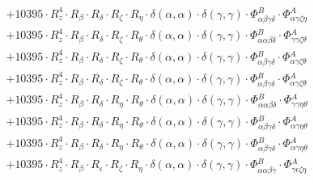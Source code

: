 \documentclass{article}
\begin{document}
\begin{subequations}
\begin{gather}
\begin{array}{c}
 \\[0.2em] 		 + 10395 \cdot R_{z}^{4} \cdot R_{\beta{}} \cdot R_{\delta{}} \cdot R_{\zeta{}} \cdot R_{\eta{}} \cdot \delta{}\left(\alpha{}, \alpha{}\right) \cdot \delta{}\left(\gamma{}, \gamma{}\right) \cdot \Phi{}^{B}_{\alpha{}\beta{}\gamma{}\delta{}} \cdot \Phi{}^{A}_{\alpha{}\gamma{}\zeta{}\eta{}} 
 \\[0.2em] 		 + 10395 \cdot R_{z}^{4} \cdot R_{\beta{}} \cdot R_{\delta{}} \cdot R_{\zeta{}} \cdot R_{\theta{}} \cdot \delta{}\left(\alpha{}, \alpha{}\right) \cdot \delta{}\left(\gamma{}, \gamma{}\right) \cdot \Phi{}^{B}_{\alpha{}\alpha{}\beta{}\delta{}} \cdot \Phi{}^{A}_{\gamma{}\gamma{}\zeta{}\theta{}} 
 \\[0.2em] 		 + 10395 \cdot R_{z}^{4} \cdot R_{\beta{}} \cdot R_{\delta{}} \cdot R_{\zeta{}} \cdot R_{\theta{}} \cdot \delta{}\left(\alpha{}, \alpha{}\right) \cdot \delta{}\left(\gamma{}, \gamma{}\right) \cdot \Phi{}^{B}_{\alpha{}\beta{}\gamma{}\delta{}} \cdot \Phi{}^{A}_{\alpha{}\gamma{}\zeta{}\theta{}} 
 \\[0.2em] 		 + 10395 \cdot R_{z}^{4} \cdot R_{\beta{}} \cdot R_{\delta{}} \cdot R_{\zeta{}} \cdot R_{\theta{}} \cdot \delta{}\left(\alpha{}, \alpha{}\right) \cdot \delta{}\left(\gamma{}, \gamma{}\right) \cdot \Phi{}^{B}_{\alpha{}\beta{}\gamma{}\delta{}} \cdot \Phi{}^{A}_{\alpha{}\gamma{}\zeta{}\theta{}} 
 \\[0.2em] 		 + 10395 \cdot R_{z}^{4} \cdot R_{\beta{}} \cdot R_{\delta{}} \cdot R_{\eta{}} \cdot R_{\theta{}} \cdot \delta{}\left(\alpha{}, \alpha{}\right) \cdot \delta{}\left(\gamma{}, \gamma{}\right) \cdot \Phi{}^{B}_{\alpha{}\alpha{}\beta{}\delta{}} \cdot \Phi{}^{A}_{\gamma{}\gamma{}\eta{}\theta{}} 
 \\[0.2em] 		 + 10395 \cdot R_{z}^{4} \cdot R_{\beta{}} \cdot R_{\delta{}} \cdot R_{\eta{}} \cdot R_{\theta{}} \cdot \delta{}\left(\alpha{}, \alpha{}\right) \cdot \delta{}\left(\gamma{}, \gamma{}\right) \cdot \Phi{}^{B}_{\alpha{}\beta{}\gamma{}\delta{}} \cdot \Phi{}^{A}_{\alpha{}\gamma{}\eta{}\theta{}} 
 \\[0.2em] 		 + 10395 \cdot R_{z}^{4} \cdot R_{\beta{}} \cdot R_{\delta{}} \cdot R_{\eta{}} \cdot R_{\theta{}} \cdot \delta{}\left(\alpha{}, \alpha{}\right) \cdot \delta{}\left(\gamma{}, \gamma{}\right) \cdot \Phi{}^{B}_{\alpha{}\beta{}\gamma{}\delta{}} \cdot \Phi{}^{A}_{\alpha{}\gamma{}\eta{}\theta{}} 
 \\[0.2em] 		 + 10395 \cdot R_{z}^{4} \cdot R_{\beta{}} \cdot R_{\epsilon{}} \cdot R_{\zeta{}} \cdot R_{\eta{}} \cdot \delta{}\left(\alpha{}, \alpha{}\right) \cdot \delta{}\left(\gamma{}, \gamma{}\right) \cdot \Phi{}^{B}_{\alpha{}\alpha{}\beta{}\gamma{}} \cdot \Phi{}^{A}_{\gamma{}\epsilon{}\zeta{}\eta{}} 

\end{array}
\end{gather}
\end{subequations}
\end{document}
